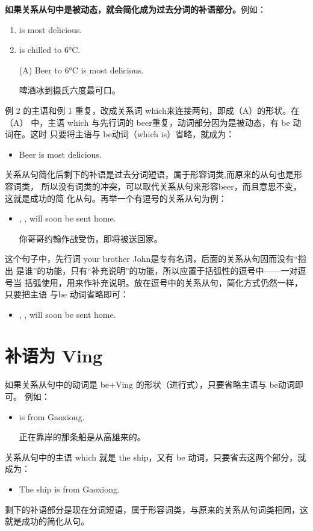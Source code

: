 \textbf{如果关系从句中是被动态，就会简化成为过去分词的补语部分。}例如：
\begin{enumerate}
\item {} is most delicious.
\item {} is chilled to 6°C.

  \reitem (A) Beer  to 6°C is most delicious.

  啤酒冰到摄氏六度最可口。
\end{enumerate}
例 2 的主语和例 1 重复，改成关系词 which来连接两句，即成（A）的形状。在（A）
中，主语 which 与先行词的 beer重复，动词部分因为是被动态，有 be 动词在。这时
只要将主语与 be动词（which is）省略，就成为：
\begin{itemize}
\item Beer  is most delicious.
\end{itemize}

关系从句简化后剩下的补语是过去分词短语，属于形容词类,而原来的从句也是形容词类，
所以没有词类的冲突，可以取代关系从句来形容beer，而且意思不变，这就是成功的简
化从句。再举一个有逗号的关系从句为例：
\begin{itemize}
\item {}, , will soon be sent home.

你哥哥约翰作战受伤，即将被送回家。
\end{itemize}
这个句子中，先行词 your brother John是专有名词，后面的关系从句因而没有“指出
是谁”的功能，只有“补充说明”的功能，所以应置于括弧性的逗号中——一对逗号当
括弧使用，用来作补充说明。放在逗号中的关系从句，简化方式仍然一样，只要把主语
与be 动词省略即可：
\begin{itemize}
\item {}, , will soon be sent home.
\end{itemize}

\section{补语为 Ving}

如果关系从句中的动词是 be+Ving 的形状（进行式），只要省略主语与 be动词即可。
例如：
\begin{itemize}
\item {}  is from Gaoxiong.

  正在靠岸的那条船是从高雄来的。
\end{itemize}
关系从句中的主语 which 就是 the ship，又有 be
动词，只要省去这两个部分，就成为：
\begin{itemize}
\item The ship  is from Gaoxiong.
\end{itemize}
剩下的补语部分是现在分词短语，属于形容词类，与原来的关系从句词类相同，这就是成功的简化从句。

